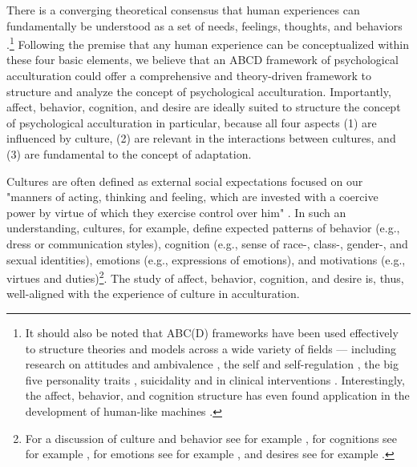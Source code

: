 \documentclass[man, 12pt, a4paper, mask]{apa7}
\begin{document}
There is a converging theoretical consensus that human experiences can fundamentally be understood as a set of needs, feelings, thoughts, and behaviors \citep[sometimes referred to as the ABCs or ABCDs of psychology: affect, behavior, cognition, desire; e.g.,][]{Cottam2010, Hogg2005, Jhangiani2014}.\footnote{It should also be noted that ABC(D) frameworks have been used effectively to structure theories and models across a wide variety of fields --- including research on attitudes \citep{Breckler1984} and ambivalence \citep{VanHarreveld2015}, the self \citep{Cote2009} and self-regulation \citep{Ben-Eliyahu2015}, the big five personality traits \citep{Wilt2016}, suicidality \citep{Harris2015} and in clinical interventions \citep{Eifert1989}. Interestingly, the affect, behavior, and cognition structure has even found application in the development of human-like machines \citep{Guo2020}.} Following the premise that any human experience can be conceptualized within these four basic elements, we believe that an ABCD framework of psychological acculturation could offer a comprehensive and theory-driven framework to structure and analyze the concept of psychological acculturation. Importantly, affect, behavior, cognition, and desire are ideally suited to structure the concept of psychological acculturation in particular, because all four aspects (1) are influenced by culture, (2) are relevant in the interactions between cultures, and (3) are fundamental to the concept of adaptation.

Cultures are often defined as external social expectations focused on our "manners of acting, thinking and feeling, which are invested with a coercive power by virtue of which they exercise control over him" \citep[][p. 52; on social facts]{Durkheim1982, Gilbert1989}. In such an understanding, cultures, for example, define expected patterns of behavior (e.g., dress or communication styles), cognition (e.g., sense of race-, class-, gender-, and sexual identities), emotions (e.g., expressions of emotions), and motivations (e.g., virtues and duties)\footnote{For a discussion of culture and behavior see for example \citet[][]{Legare2019, Whiting1980}, for cognitions see for example \citet[][]{Gelfand2011, Nisbett2002}, for emotions see for example \citet[][]{Holodynski2012, Boiger2018}, and desires see for example \citet[][]{McInerney2016, Morling2017}.}. The study of affect, behavior, cognition, and desire is, thus, well-aligned with the experience of culture in acculturation.
\end{document}
